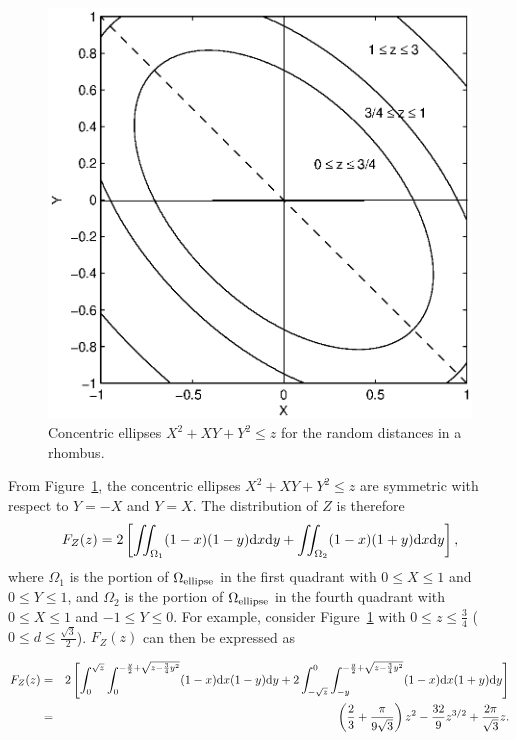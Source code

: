 \documentclass[12pt,draftclsnofoot,onecolumn]{IEEEtran}
\begin{document}
\begin{figure}
  \centering
  \includegraphics[width=0.5\columnwidth]{fig/rhombus_within}
  \caption{Concentric ellipses $X^2+XY+Y^2 \leq z$ for the random distances in a rhombus.}
  \label{fig:z1}
\end{figure}

From Figure~\ref{fig:z1}, the concentric ellipses $X^2+XY+Y^2 \leq z$ are symmetric with respect to $Y=-X$ and $Y=X$.
The distribution of $Z$ is therefore
\begin{equation}
\label{eq:within}
F_Z(z)=2\left[\iint_{\Omega_1}(1-x)(1-y){\rm d}x{\rm
d}y+\iint_{\Omega_2}(1-x)(1+y){\rm d}x{\rm d}y\right],
\end{equation}
where $\Omega_1$ is the portion of $\Omega_{\rm ellipse}$ in the first quadrant with
$0 \leq X\leq 1$ and $0 \leq Y \leq 1$, and $\Omega_2$ is the portion of
$\Omega_{\rm ellipse}$ in the fourth quadrant with
$0 \leq X \leq 1$ and $-1 \leq Y \leq 0$.
For example, consider Figure~\ref{fig:z1} with $0\leq z \leq \frac{3}{4}$ ($0\leq d\leq\frac{\sqrt{3}}{2}$).
$F_Z(z)$ can then be expressed as
\begin{small}
\begin{eqnarray}\label{eq:Z1_r_within}
F_Z(z)&=&2\left[\int_{0}^{\sqrt{z}}\int_{0}^{-\frac{y}{2}+\sqrt{z-\frac{3}{4}y^2
}}(1-x){\rm d}x(1-y){\rm
d}y+2\int_{-\sqrt{z}}^0\int_{-y}^{-\frac{y}{2}+\sqrt{z-\frac{3}{4}
y^2}}(1-x){\rm d}x(1+y){\rm d}y\right] \nonumber\\
&=&\left(\frac{2}{3}+\frac{\pi}{9\sqrt{3}}\right)z^2-\frac{32}{9}z^{3/2}+\frac{
2\pi}{\sqrt{3}}z.
\end{eqnarray}
\end{small}%
\end{document}
